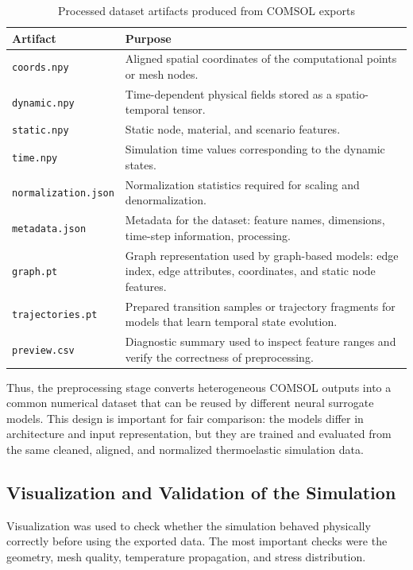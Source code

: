 \begin{table}[H]
\centering
\caption{Processed dataset artifacts produced from COMSOL exports}
\label{tab:processed_dataset_artifacts}
\begin{tabular}{p{} p{}}
\hline
\textbf{Artifact} & \textbf{Purpose} \\
\hline
\texttt{coords.npy} &
Aligned spatial coordinates of the computational points or mesh nodes. \\
\hline
\texttt{dynamic.npy} &
Time-dependent physical fields stored as a spatio-temporal tensor. \\
\hline
\texttt{static.npy} &
Static node, material, and scenario features. \\
\hline
\texttt{time.npy} &
Simulation time values corresponding to the dynamic states. \\
\hline
\texttt{normalization.json} &
Normalization statistics required for scaling and denormalization. \\
\hline
\texttt{metadata.json} &
Metadata for the dataset: feature names, dimensions, time-step information, processing. \\
\hline
\texttt{graph.pt} &
Graph representation used by graph-based models: edge index, edge attributes, coordinates, and static node features. \\
\hline
\texttt{trajectories.pt} &
Prepared transition samples or trajectory fragments for models that learn temporal state evolution. \\
\hline
\texttt{preview.csv} &
Diagnostic summary used to inspect feature ranges and verify the correctness of preprocessing. \\
\hline
\end{tabular}
\end{table}

Thus, the preprocessing stage converts heterogeneous COMSOL outputs into a common numerical dataset that can be reused by different neural surrogate models. This design is important for fair comparison: the models differ in architecture and input representation, but they are trained and evaluated from the same cleaned, aligned, and normalized thermoelastic simulation data.

\subsection{Visualization and Validation of the Simulation}

Visualization was used to check whether the simulation behaved physically correctly before using the exported data. The most important checks were the geometry, mesh quality, temperature propagation, and stress distribution.

